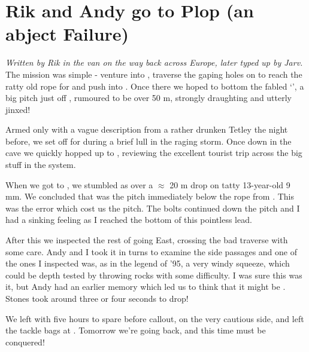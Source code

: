 \section{Rik and Andy go to Plop (an abject
Failure)}


\textit{Written by Rik in the van on the way back across Europe, later typed up by Jarv.}\\

The mission was simple - venture into , traverse the gaping
holes on  to reach the ratty old rope for 
and push into . Once there we hoped to bottom the fabled
`', a big pitch just off , rumoured to be over 50 m,
strongly draughting and utterly jinxed!

Armed only with a vague description from a rather drunken Tetley the
night before, we set off for  during a brief lull in the
raging storm. Once down in the cave we quickly hopped up to ,
reviewing the excellent tourist trip across the big stuff in the system.

When we got to , we stumbled as  over a $\approx$ 20 m drop on tatty 13-year-old 9
mm. We concluded that  was the pitch immediately below the rope from
. This was the error which cost us the pitch. The bolts continued
down the pitch and I had a sinking feeling as I reached the bottom of
this pointless lead.

After this we inspected the rest of  going East, crossing the
bad traverse with some care. Andy and I took it in turns to examine the
side passages and one of the ones I inspected was, as in the legend of
'95, a very windy squeeze, which could be depth tested by throwing rocks
with some difficulty. I was sure this was it, but Andy had an earlier
memory which led us to think that it might be . Stones took
around three or four seconds to drop!

We left with five hours to spare before callout, on the very cautious
side, and left the tackle bags at . Tomorrow we're going back,
and this time  must be conquered!

